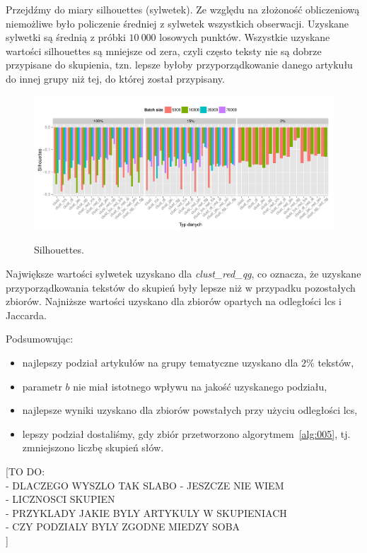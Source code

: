 \documentclass{praca1}
\begin{document}
Przejdźmy do miary silhouettes (sylwetek). Ze względu na złożoność obliczeniową niemożliwe było policzenie średniej z sylwetek wszystkich obserwacji. Uzyskane sylwetki są średnią z próbki $10\ 000$ losowych punktów. Wszystkie uzyskane wartości silhouettes są mniejsze od zera, czyli często teksty nie są dobrze przypisane do skupienia, tzn. lepsze byłoby przyporządkowanie danego artykułu do innej grupy niż tej, do której został przypisany.

\begin{figure}[!h]
  \centering
  \includegraphics[width=400pt]{plot14.pdf}\\
  \caption{Silhouettes.}\label{plot:009}
\end{figure}

Największe wartości sylwetek uzyskano dla \emph{clust\_red\_qg}, co oznacza, że uzyskane przyporządkowania tekstów do skupień były lepsze niż w przypadku pozostałych zbiorów. Najniższe wartości uzyskano dla zbiorów opartych na odległości lcs i Jaccarda.

Podsumowując:
\begin{itemize}
\item najlepszy podział artykułów na grupy tematyczne uzyskano dla $2\%$ tekstów,
\item parametr $b$ nie miał istotnego wpływu na jakość uzyskanego podziału,
\item najlepsze wyniki uzyskano dla zbiorów powstałych przy użyciu odległości lcs,
\item lepszy podział dostaliśmy, gdy zbiór przetworzono algorytmem~\ref{alg:005}, tj. zmniejszono liczbę skupień słów.
\end{itemize}

[TO DO:\\
- DLACZEGO WYSZLO TAK SLABO - JESZCZE NIE WIEM\\
- LICZNOSCI SKUPIEN\\
- PRZYKLADY JAKIE BYLY ARTYKULY W SKUPIENIACH\\
- CZY PODZIALY BYLY ZGODNE MIEDZY SOBA\\
]
\end{document}
